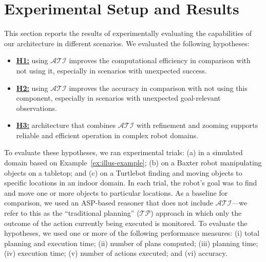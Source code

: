 \documentclass[letterpaper, 10 pt, conference]{article}  %
\begin{document}
\section{Experimental Setup and Results}
\label{sec:expres}
This section reports the results of experimentally evaluating the
capabilities of our architecture in different scenarios.  We evaluated
the following hypotheses:
\begin{itemize}
\item \underline{\textbf{H1:}} using $\mathcal{ATI}$ improves the
  computational efficiency in comparison with not using it, especially
  in scenarios with unexpected success.
\item \underline{\textbf{H2:}} using $\mathcal{ATI}$ improves the
  accuracy in comparison with not using this component, especially in
  scenarios with unexpected goal-relevant observations.
\item \underline{\textbf{H3:}} architecture that combines
  $\mathcal{ATI}$ with refinement and zooming supports reliable and
  efficient operation in complex robot domains.
\end{itemize}
To evaluate these hypotheses, we ran experimental trials: (a) in a
simulated domain based on Example~\ref{ex:illus-example}; (b) on a
Baxter robot manipulating objects on a tabletop; and (c) on a
Turtlebot finding and moving objects to specific locations in an
indoor domain. In each trial, the robot's goal was to find and move
one or more objects to particular locations. As a baseline for
comparison, we used an ASP-based reasoner that does not include
$\mathcal{ATI}$---we refer to this as the ``traditional planning''
($\mathcal{TP}$) approach in which only the outcome of the action
currently being executed is monitored. To evaluate the hypotheses, we
used one or more of the following performance measures: (i) total
planning and execution time; (ii) number of plans computed; (iii)
planning time; (iv) execution time; (v) number of actions executed;
and (vi) accuracy.
\end{document}
